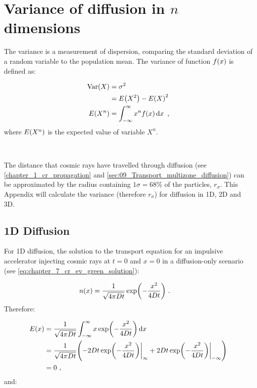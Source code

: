 \chapter{Variance of diffusion in $n$ dimensions} \label{sec:A5_variance}

The variance is a measurement of dispersion, comparing the standard deviation of a random variable to the population mean. The variance of function $f\qty(x)$ is defined as:

\begin{equation}
    \begin{aligned}
        \mathrm{Var}\qty(X)&=\sigma^2 \\
        &=E\qty(X^2)-E\qty(X)^2 \\
        E\qty(X^n)&=\int_{-\infty}^\infty x^nf\qty(x)\dd{x}\text{ ,} 
    \end{aligned}
\end{equation}
\noindent where $E\qty(X^n)$ is the expected value of variable $X^n$.
\par~\par 
The distance that cosmic rays have travelled through diffusion (see \autoref{chapter_1_cr_propagation} and \autoref{sec:09_Transport_multizone_diffusion}) can be approximated by the radius containing $1\sigma=68\%$ of the particles, $r_\sigma$. This Appendix will calculate the variance (therefore $r_\sigma$) for diffusion in 1D, 2D and 3D. 

\section{1D Diffusion}

\noindent For 1D diffusion, the solution to the transport equation for an impulsive accelerator injecting cosmic rays at $t=0$ and $x=0$ in a diffusion-only scenario (see \autoref{eq:chapter_7_cr_ev_green_solution}):

\begin{equation}
    \begin{aligned}
        n\qty(x)&=\frac{1}{\sqrt{4\pi Dt}}\exp(-\frac{x^2}{4Dt})\text{ .} 
    \end{aligned}
\end{equation}
\noindent Therefore:

\begin{equation}
    \begin{aligned}
        E\qty(x)&=\frac{1}{\sqrt{4\pi Dt}}\int_{-\infty}^\infty x\exp(-\frac{x^2}{4Dt})\dd{x} \\
        &=\frac{1}{\sqrt{4\pi Dt}}\qty(-2Dt\exp(-\frac{x^2}{4Dt})\bigg|_\infty+2Dt\exp(-\frac{x^2}{4Dt})\bigg|_{-\infty}) \\
        &=0\text{ ,} 
    \end{aligned}
\end{equation}
\noindent and:

